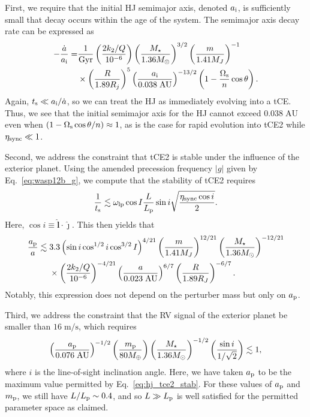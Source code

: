 \documentclass[
        fleqn,
        usenatbib,
    ]{mnras}
\newcommand*{\abs}[1]{\left|#1\right|}
\newcommand*{\p}[1]{\left(#1\right)}
\newcommand*{\s}[1]{\left[#1\right]}
\newcommand*{\uv}[1]{\hat{\boldsymbol{\mathbf{#1}}}}
\begin{document}
First, we require that the initial HJ semimajor axis, denoted $a_{\rm i}$, is
sufficiently small that decay occurs within the age of the system. The semimajor
axis decay rate can be expressed as
\begin{align}
    -\frac{\dot{a}}{a_{\rm i}}
        =& \frac{1}{\mathrm{Gyr}}
            \p{\frac{2k_2/Q}{10^{-6}}}
            \p{\frac{M_\star}{1.36 M_{\odot}}}^{3/2}
            \p{\frac{m}{1.41M_J}}^{-1}\nonumber\\
        &\times \p{\frac{R}{1.89R_j}}^5
            \p{\frac{a_{\rm i}}{0.038\;\mathrm{AU}}}^{-13/2}
            \p{1 - \frac{\Omega_{\rm s}}{n}\cos \theta}.
            \label{eq:hj_adot}
\end{align}
Again, $t_{\rm s} \ll a_{\rm i} / \dot{a}$, so we can treat the HJ as
immediately evolving into a tCE\@. Thus, we see that the initial semimajor axis
for the HJ cannot exceed $0.038\;\mathrm{AU}$ even when $\p{1 - \Omega_{\rm
s}\cos \theta/n} \approx 1$, as is the case for rapid evolution into tCE2 while
$\eta_{\rm sync} \ll 1$.

Second, we address the constraint that tCE2 is stable under the influence of the
exterior planet. Using the amended precession frequency $\abs{g}$ given by
Eq.~\eqref{eq:wasp12b_g}, we compute that the stability of tCE2 requires
\begin{equation}
    \frac{1}{t_{\rm s}} \lesssim \omega_{\rm lp}\cos I \frac{L}{L_{\rm p}}
        \sin i \sqrt{\frac{\eta_{\rm sync}\cos i}{2}}.
\end{equation}
Here, $\cos i \equiv \uv{l} \cdot \uv{\jmath}$. This then yields that
\begin{align}
    \frac{a_{\rm p}}{a}
        \lesssim{}& 3.3 \p{\sin i \cos^{1/2} i \cos^{3/2} I}^{4/21}
            \p{\frac{m}{1.41 M_J}}^{12/21}
            \p{\frac{M_\star}{1.36 M_{\odot}}}^{-12/21}\nonumber\\
        &\times \p{\frac{2k_2/Q}{10^{-6}}}^{-4/21}
            \p{\frac{a}{0.023\;\mathrm{AU}}}^{6/7}
            \p{\frac{R}{1.89 R_J}}^{-6/7}.\label{eq:hj_tce2_stab}
\end{align}
Notably, this expression does not depend on the perturber mass but only on
$a_{\rm p}$.

Third, we address the constraint that the RV signal of the exterior planet be
smaller than $16\;\mathrm{m/s}$, which requires
\begin{equation}
    \p{\frac{a_{\rm p}}{0.076\;\mathrm{AU}}}^{-1/2}
    \p{\frac{m_{\rm p}}{80M_{\oplus}}}
    \p{\frac{M_\star}{1.36M_{\odot}}}^{-1/2}
    \p{\frac{\sin i}{1 / \sqrt{2}}} \lesssim 1,
    \label{eq:hj_rv}
\end{equation}
where $i$ is the line-of-sight inclination angle. Here, we have taken $a_{\rm
p}$ to be the maximum value permitted by Eq.~\eqref{eq:hj_tce2_stab}. For these
values of $a_{\rm p}$ and $m_{\rm p}$, we still have $L / L_{\rm p} \sim 0.4$,
and so $L \gg L_{\rm p}$ is well satisfied for the permitted parameter space as
claimed.
\end{document}
